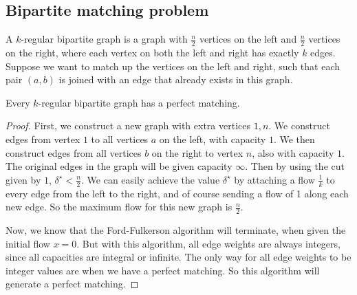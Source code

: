 \subsection{Bipartite matching problem}
A \( k \)-regular bipartite graph is a graph with \( \frac{n}{2} \) vertices on the left and \( \frac{n}{2} \) vertices on the right, where each vertex on both the left and right has exactly \( k \) edges.
Suppose we want to match up the vertices on the left and right, such that each pair \( (a,b) \) is joined with an edge that already exists in this graph.
\begin{theorem}
	Every \( k \)-regular bipartite graph has a perfect matching.
\end{theorem}
\begin{proof}
	First, we construct a new graph with extra vertices \( 1, n \).
	We construct edges from vertex \( 1 \) to all vertices \( a \) on the left, with capacity \( 1 \).
	We then construct edges from all vertices \( b \) on the right to vertex \( n \), also with capacity \( 1 \).
	The original edges in the graph will be given capacity \( \infty \).
	Then by using the cut given by \( { 1 } \), \( \delta^\star < \frac{n}{2} \).
	We can easily achieve the value \( \delta^\star \) by attaching a flow \( \frac{1}{k} \) to every edge from the left to the right, and of course sending a flow of 1 along each new edge.
	So the maximum flow for this new graph is \( \frac{n}{2} \).

	Now, we know that the Ford-Fulkerson algorithm will terminate, when given the initial flow \( x = 0 \).
	But with this algorithm, all edge weights are always integers, since all capacities are integral or infinite.
	The only way for all edge weights to be integer values are when we have a perfect matching.
	So this algorithm will generate a perfect matching.
\end{proof}
